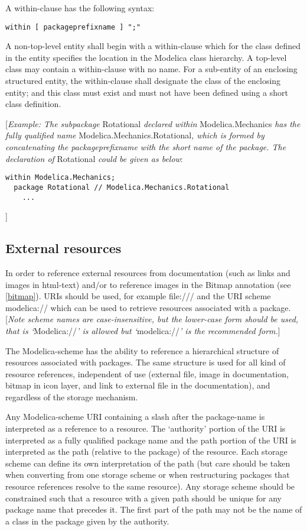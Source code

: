 A within-clause has the following syntax:

\begin{lstlisting}[language=grammar]
  within [ packageprefixname ] ";"
\end{lstlisting}
  A non-top-level entity shall begin with a within-clause which for the
  class defined in the entity specifies the location in the Modelica class
    hierarchy. A top-level class may contain a within-clause with no name.
    For a sub-entity of an enclosing structured entity, the within-clause
shall designate the class of the enclosing entity; and this class must
exist and must not have been defined using a short class definition.

{[}\emph{Example: The subpackage} Rotational \emph{declared within}
Modelica.Mechanics \emph{has the fully qualified name}
Modelica.Mechanics.Rotational\emph{, which is formed by concatenating
the packageprefixname with the short name of the package. The
declaration of} Rotational \emph{could be given as below}:

\begin{lstlisting}[language=modelica]
  within Modelica.Mechanics;
  package Rotational // Modelica.Mechanics.Rotational
    ...
\end{lstlisting}
{]}

\subsection{External resources}

In order to reference external resources from documentation (such as
links and images in html-text) and/or to reference images in the Bitmap
annotation (see \ref{bitmap}). URIs should be used, for example
file:/// and the URI scheme modelica:// which can be used to retrieve
resources associated with a package. {[}\emph{Note scheme names are
case-insensitive, but the lower-case form should be used, that is
`}Modelica://\emph{' is allowed but `}modelica://\emph{' is the
recommended form.}{]}

The Modelica-scheme has the ability to reference a hierarchical
structure of resources associated with packages. The same structure is
used for all kind of resource references, independent of use (external
file, image in documentation, bitmap in icon layer, and link to external
file in the documentation), and regardless of the storage mechanism.

Any Modelica-scheme URI containing a slash after the package-name is
interpreted as a reference to a resource. The `authority' portion of the
URI is interpreted as a fully qualified package name and the path
portion of the URI is interpreted as the path (relative to the package)
of the resource. Each storage scheme can define its own interpretation
of the path (but care should be taken when converting from one storage
scheme or when restructuring packages that resource references resolve
to the same resource). Any storage scheme should be constrained such
that a resource with a given path should be unique for any package name
that precedes it. The first part of the path may not be the name of a
class in the package given by the authority.

